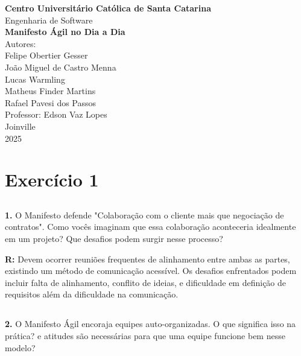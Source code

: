 \documentclass[12pt,a4paper]{article}
\begin{document}
\begin{center}
    \centering

    {\Large \textbf{Centro Universitário Católica de Santa Catarina}}\\[0.5cm]
    {\large Engenharia de Software}\\[4cm]

    {\Huge \textbf{Manifesto Ágil no Dia a Dia}}\\[0.5cm]

    {\large Autores:}\\[0.5cm]
    {\large Felipe Obertier Gesser}\\[0.5cm]
    {\large João Miguel de Castro Menna}\\[0.5cm]
    {\large Lucas Warmling}\\[0.5cm]
    {\large Matheus Finder Martins}\\[0.5cm]
    {\large Rafael Pavesi dos Passos}\\[2.5cm]

    {\large Professor: Edson Vaz Lopes}\\[0.5cm]

    \vfill
    {\large Joinville}\\
    {\large 2025}
\end{center}

\section{Exercício 1}

\subsection{}

\textbf{1.} O Manifesto defende "Colaboração com o cliente mais que negociação de contratos".
Como vocês imaginam que essa colaboração aconteceria idealmente em um projeto?
Que desafios podem surgir nesse processo?

\textbf{R:} Devem ocorrer reuniões frequentes de alinhamento entre ambas as partes, existindo um método
de comunicação acessível. Os desafios enfrentados podem incluir falta de alinhamento, conflito
de ideias, e dificuldade em definição de requisitos além da dificuldade na comunicação.

\subsection{}

\textbf{2.} O Manifesto Ágil encoraja equipes auto-organizadas. O que significa isso na prática?
e atitudes são necessárias para que uma equipe funcione bem nesse modelo?
\end{document}
